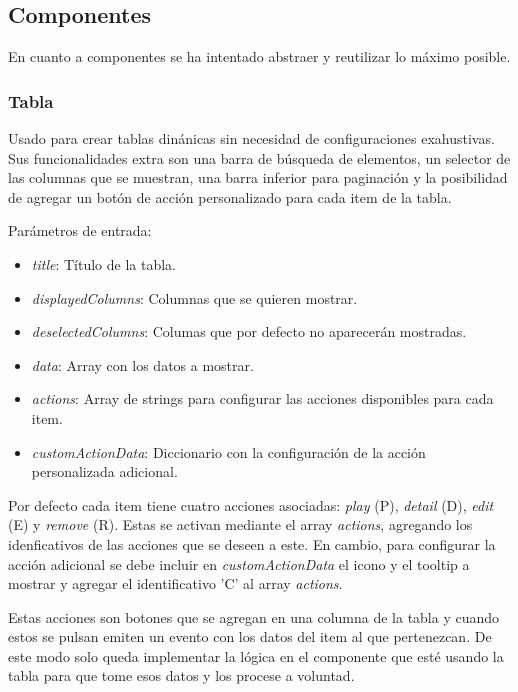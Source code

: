 \subsection{Componentes}


\bigskip
En cuanto a componentes se ha intentado abstraer y reutilizar lo máximo posible.


\subsubsection{Tabla}


Usado para crear tablas dinánicas sin necesidad de configuraciones exahustivas. Sus funcionalidades extra son una barra de búsqueda de elementos, un selector de las columnas que se muestran, una barra inferior para paginación y la posibilidad de agregar un botón de acción personalizado para cada item de la tabla. 

\bigskip
Parámetros de entrada:
\begin{itemize}
	\item \textit{title}: Título de la tabla.
	\item \textit{displayedColumns}: Columnas que se quieren mostrar.
	\item \textit{deselectedColumns}: Columas que por defecto no aparecerán mostradas.
	\item \textit{data}: Array con los datos a mostrar.
	\item \textit{actions}: Array de strings para configurar las acciones disponibles para cada item.
	\item \textit{customActionData}: Diccionario con la configuración de la acción personalizada adicional.
\end{itemize}

\bigskip	
Por defecto cada item tiene cuatro acciones asociadas: \textit{play} (P), \textit{detail} (D), \textit{edit} (E) y \textit{remove} (R). Estas se activan mediante el array \textit{actions}, agregando los idenficativos de las acciones que se deseen a este. En cambio, para configurar la acción adicional se debe incluir en \textit{customActionData} el icono y el tooltip a mostrar y agregar el identificativo 'C' al array \textit{actions}.

\bigskip
Estas acciones son botones que se agregan en una columna de la tabla y cuando estos se pulsan emiten un evento con los datos del item al que pertenezcan. De este modo solo queda implementar la lógica en el componente que esté usando la tabla para que tome esos datos y los procese a voluntad.

